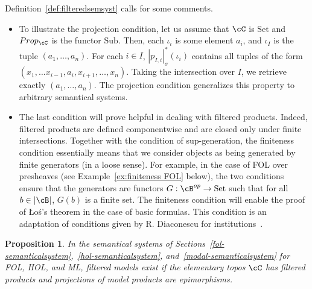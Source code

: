 \documentclass[preprint,3p,times]{elsarticle}
\newtheorem{proposition}[definition]{Proposition}
\newcommand{\Set}{\mathrm{Set}}
\newcommand{\Sub}{\mathrm{Sub}}
\newcommand{\Los}{\L{}o{\'s}}
\begin{document}
Definition~\ref{def:filteredsemsyst} calls for some comments.
\begin{itemize}
    \item To illustrate the projection condition, let us assume that \(\cC\) is \(\Set\) and \(Prop_\cC\) is the functor \(\Sub\). Then, each \(\iota_i\) is some element \(a_i\), and \(\iota_I\) is the tuple \((a_1, \ldots, a_n)\). For each \(i\in I\), \(|p_{I,i}|^*_\sigma(\iota_i)\) contains all tuples of the form \((x_1,\ldots x_{i-1},a_i,x_{i+1}, \ldots, x_{n})\). Taking the intersection over \(I\), we retrieve exactly \((a_1, \ldots, a_n)\). The projection condition generalizes this property to arbitrary semantical systems.

    
    \item The last condition will prove helpful in dealing with filtered products. Indeed, filtered products are defined componentwise and are closed only under finite intersections. Together with the condition of sup-generation, the finiteness condition essentially means that we consider objects as being generated by finite generators (in a loose sense). For example, in the case of FOL over presheaves (see Example~\ref{ex:finiteness FOL} below), the two conditions ensure that the generators are functors $G: \cB^{op} \to \Set$ such that for all $b \in |\cB|$, $G(b)$ is a finite set. The finiteness condition will enable the proof of \Los's theorem in the case of basic formulas. This condition is an adaptation of conditions given by R. Diaconescu for institutions~\cite{Dia08}.
\end{itemize}

\begin{proposition}
    In the semantical systems of Sections~\ref{fol-semanticalsystem},~\ref{hol-semanticalsystem}, and~\ref{modal-semanticalsystem} for FOL, HOL, and ML, filtered models exist if the elementary topos $\cC$ has filtered products and projections of model products are epimorphisms.
\end{proposition}
\end{document}

